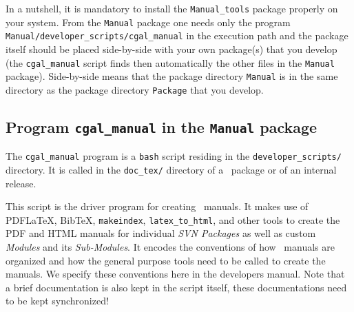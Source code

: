 In a nutshell, it is mandatory to install the \texttt{Manual\_tools}
package properly on your system. From the \texttt{Manual} package one
needs only the program \texttt{Manual/developer\_scripts/cgal\_manual}
in the execution path and the package itself should be placed
side-by-side with your own package(s) that you develop (the
\texttt{cgal\_manual} script finds then automatically the other files
in the \texttt{Manual} package). Side-by-side means that the package
directory \texttt{Manual} is in the same directory as the package
directory \texttt{Package} that you develop.


\subsection{Program \texttt{cgal\_manual} in the \texttt{Manual} package}
\label{subsec:cgal_manual_program}

The \texttt{cgal\_manual} program is a \texttt{bash} script residing
in the \texttt{developer\_scripts/} directory. It is called in the
\texttt{doc\_tex/} directory of a \cgal\ package or of an internal
release.

This script is the driver program for creating \cgal\ manuals.  It
makes use of PDF\LaTeX, Bib\TeX, \texttt{makeindex},
\texttt{latex\_to\_html}, and other tools to create the
PDF and HTML manuals for individual \emph{SVN Packages} as well as
custom \emph{Modules} and its \emph{Sub-Modules}. It encodes the conventions
of how \cgal\ manuals are organized and how the general purpose tools need
to be called to create the manuals. We specify these conventions here in the
developers manual. Note that a brief documentation is also kept in the
script itself, these documentations need to be kept synchronized!

